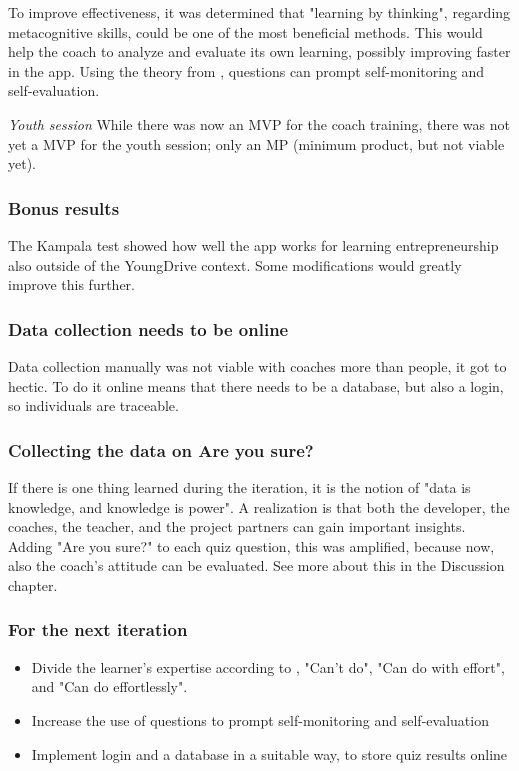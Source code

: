   To improve effectiveness, it was determined that "learning by thinking", regarding metacognitive skills, could be one of the most beneficial methods. This would help the coach to analyze and evaluate its own learning, possibly improving faster in the app. Using the theory from \cite{sitzmann}, questions can prompt self-monitoring and self-evaluation.

  \textit{Youth session}
  While there was now an MVP for the coach training, there was not yet a MVP for the youth session; only an MP (minimum product, but not viable yet).

  \subsubsection{Bonus results}
  The Kampala test showed how well the app works for learning entrepreneurship also outside of the YoungDrive context. Some modifications would greatly improve this further.

  \subsubsection{Data collection needs to be online}

  Data collection manually was not viable with coaches more than people, it got to hectic. To do it online means that there needs to be a database, but also a login, so individuals are traceable.

  \subsubsection{Collecting the data on Are you sure?}
  If there is one thing learned during the iteration, it is the notion of "data is knowledge, and knowledge is power". A realization is that both the developer, the coaches, the teacher, and the project partners can gain important insights. Adding "Are you sure?" to each quiz question, this was amplified, because now, also the coach's attitude can be evaluated. See more about this in the Discussion chapter. 

  \subsubsection{For the next iteration}
  \begin{itemize}
  \item Divide the learner's expertise according to \cite{sierra}, "Can't do", "Can do with effort", and "Can do effortlessly".
  \item Increase the use of questions to prompt self-monitoring and self-evaluation
  \item Implement login and a database in a suitable way, to store quiz results online
  \end{itemize}

